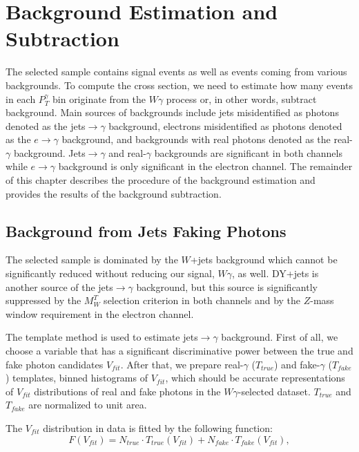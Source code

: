 \section{Background Estimation and Subtraction}
\label{sec:BackgroundSubtraction}

The selected sample contains signal events as well as events coming from various backgrounds. To compute the cross section, we need to estimate how many events in each $P_T^\gamma$ bin originate from the $W\gamma$ process or, in other words, subtract background. Main sources of backgrounds include jets misidentified as photons denoted as the jets$\rightarrow\gamma$ background, electrons misidentified as photons denoted as the $e\rightarrow\gamma$ background, and backgrounds with real photons denoted as the real-$\gamma$ background. Jets$\rightarrow\gamma$ and real-$\gamma$ backgrounds are significant in both channels while $e\rightarrow\gamma$ background is only significant in the electron channel. The remainder of this chapter describes the procedure of the background estimation and provides the results of the background subtraction.

\subsection{Background from Jets Faking Photons}
\label{sec:BackgroundSubtraction_jtog}

The selected sample is dominated by the $W$+jets background which cannot be significantly reduced without reducing our signal, $W\gamma$, as well. DY+jets is another source of the jets$\rightarrow \gamma$ background, but this source is significantly suppressed by the $M_W^T$ selection criterion in both channels and by the $Z$-mass window requirement in the electron channel.

The template method is used to estimate jets$ \rightarrow \gamma$ background. First of all, we choose a variable that has a significant discriminative power between the true and fake photon candidates $V_{fit}$. After that, we prepare real-$\gamma$ ($T_{true}$) and fake-$\gamma$ ($T_{fake}$) templates, binned histograms of $V_{fit}$, which should be accurate representations of $V_{fit}$ distributions of real and fake photons in the $W\gamma$-selected dataset. $T_{true}$ and $T_{fake}$ are normalized to unit area. 

The $V_{fit}$ distribution in data is fitted by the following function: 
\begin{equation}\label{eq:F_fit}
F(V_{fit})=N_{true} \cdot T_{true}(V_{fit}) + N_{fake} \cdot T_{fake}(V_{fit}),
\end{equation}

